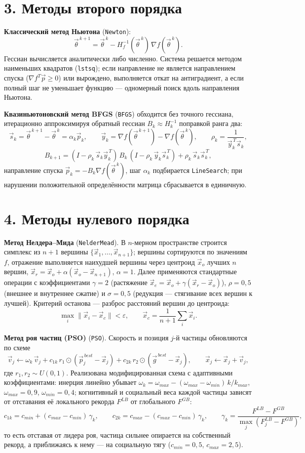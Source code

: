 \documentclass[a4paper]{article}
\newcommand{\subsectiontext}[1]{%
    \section*{\fontsize{13pt}{0pt}\selectfont\textbf{#1}}%
}
\begin{document}
\subsectiontext{3. Методы второго порядка}

\textbf{Классический метод Ньютона} (\texttt{Newton}):
\[
    \vec{\theta}^{\,k+1} = \vec{\theta}^{\,k} - H_f^{-1}(\vec{\theta}^{\,k})\, \nabla f(\vec{\theta}^{\,k}).
\]
Гессиан вычисляется аналитически либо численно. Система решается методом наименьших квадратов (\texttt{lstsq}); если направление не является направлением спуска ($\nabla f^T \vec{p} \ge 0$) или вырождено, выполняется откат на антиградиент, а если полный шаг не уменьшает функцию — одномерный поиск вдоль направления Ньютона.

\textbf{Квазиньютоновский метод BFGS} (\texttt{BFGS}) обходится без точного гессиана, итерационно аппроксимируя обратный гессиан $B_k \approx H_k^{-1}$ поправкой ранга два:
\[
    \vec{s}_k = \vec{\theta}^{\,k+1} - \vec{\theta}^{\,k} = \alpha_k \vec{p}_k,
    \qquad
    \vec{y}_k = \nabla f(\vec{\theta}^{\,k+1}) - \nabla f(\vec{\theta}^{\,k}),
    \qquad
    \rho_k = \frac{1}{\vec{y}_k^{\,T} \vec{s}_k},
\]
\[
    B_{k+1} = (I - \rho_k\, \vec{s}_k \vec{y}_k^{\,T})\, B_k\, (I - \rho_k\, \vec{y}_k \vec{s}_k^{\,T}) + \rho_k\, \vec{s}_k \vec{s}_k^{\,T},
\]
направление спуска $\vec{p}_k = -B_k \nabla f(\vec{\theta}^{\,k})$, шаг $\alpha_k$ подбирается \texttt{LineSearch}; при нарушении положительной определённости матрица сбрасывается в единичную.

\subsectiontext{4. Методы нулевого порядка}

\textbf{Метод Нелдера–Мида} (\texttt{NelderMead}). В $n$-мерном пространстве строится симплекс из $n+1$ вершины $\{\vec{x}_1, \dots, \vec{x}_{n+1}\}$; вершины сортируются по значениям $f$, отражение выполняется наихудшей вершины через центроид $\vec{x}_o$ лучших $n$ вершин, $\vec{x}_r = \vec{x}_o + \alpha (\vec{x}_o - \vec{x}_{n+1})$, $\alpha = 1$. Далее применяются стандартные операции с коэффициентами $\gamma = 2$ (растяжение $\vec{x}_e = \vec{x}_o + \gamma(\vec{x}_r - \vec{x}_o)$), $\rho = 0{,}5$ (внешнее и внутреннее сжатие) и $\sigma = 0{,}5$ (редукция — стягивание всех вершин к лучшей). Критерий останова — разброс расстояний вершин до центроида:
\[
    \max_i \|\vec{x}_i - \vec{x}_c\| < \varepsilon, \qquad \vec{x}_c = \frac{1}{n+1}\sum_i \vec{x}_i.
\]

\textbf{Метод роя частиц (PSO)} (\texttt{PSO}). Скорость и позиция $j$-й частицы обновляются по схеме
\[
    \vec{v}_j \leftarrow \omega_k\, \vec{v}_j + c_{1k}\, r_1 \odot (\vec{p}_j^{\,best} - \vec{x}_j) + c_{2k}\, r_2 \odot (\vec{g}^{\,best} - \vec{x}_j),
    \qquad
    \vec{x}_j \leftarrow \vec{x}_j + \vec{v}_j,
\]
где $r_1, r_2 \sim U(0,1)$. Реализована модифицированная схема с адаптивными коэффициентами: инерция линейно убывает $\omega_k = \omega_{max} - (\omega_{max} - \omega_{min})\, k / k_{max}$, $\omega_{max} = 0{,}9$, $\omega_{min} = 0{,}4$; когнитивный и социальный веса каждой частицы зависят от отставания её локального рекорда $F^{LB}$ от глобального $F^{GB}$:
\[
    c_{1k} = c_{min} + (c_{max} - c_{min})\, \gamma_k,
    \qquad
    c_{2k} = c_{max} - (c_{max} - c_{min})\, \gamma_k,
    \qquad
    \gamma_k = \frac{F^{LB} - F^{GB}}{\max_j (F^{LB}_j - F^{GB})},
\]
то есть отставая от лидера роя, частица сильнее опирается на собственный рекорд, а приближаясь к нему — на социальную тягу ($c_{min} = 0{,}5$, $c_{max} = 2{,}5$).
\end{document}
